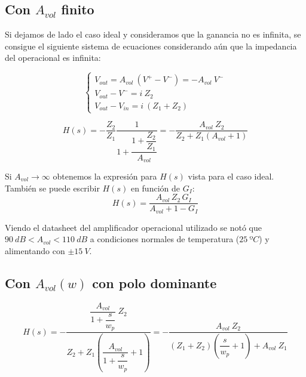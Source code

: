 \documentclass[11pt, a4paper]{article}
\begin{document}
\subsection{Con $A_{vol}$ finito}
Si dejamos de lado el caso ideal y consideramos que la ganancia no es infinita, se consigue el siguiente sistema de ecuaciones considerando aún que la impedancia del operacional es infinita:

\begin{equation}
\begin{cases}
V_{out} = A_{vol} \ (V^+ - V^-) = - A_{vol} \ V^- \\ V_{out} - V^- = i \ Z_2 \\ V_{out} - V_{in} = i \ (Z_1+Z_2) 
\end{cases} 
\end{equation}

\begin{equation}
H(s) = - \dfrac{Z_2}{Z_1} \dfrac{1}{1+\dfrac{1+\dfrac{Z_2}{Z_1}}{A_{vol}}}
= -
\dfrac{A_{vol} \ Z_2}{Z_2 + Z_1 (A_{vol} +1)}
\end{equation}

Si $A_{vol} \longrightarrow \infty$ obtenemos la expresión para $H(s)$ vista para el caso ideal.
También se puede escribir $H(s)$ en función de $G_I$:
\begin{equation}
H(s) = \dfrac{A_{vol} \, Z_2 \, G_I}{A_{vol} + 1 - G_I} 
\end{equation}

Viendo el datasheet del amplificador operacional utilizado se notó que $90 \ dB< A_{vol} < 110 \ dB$ a condiciones normales de temperatura ($25 \ ºC$) y alimentando con $\pm 15 \ V$.

\subsection{Con $A_{vol}(w)$ con polo dominante}
\begin{equation}
H(s) = - \dfrac{\dfrac{A_{vol}}{1+\dfrac{s}{w_p}} \ Z_2}{Z_2 + Z_1 \left(\dfrac{A_{vol}}{1+\dfrac{s}{w_p}} +1 \right)} 
=
-\dfrac{A_{vol} \ Z_2}{(Z_1+Z_2) \left(\dfrac{s}{w_p}+1 \right)+ A_{vol} \ Z_1}
\end{equation}

\end{document}

